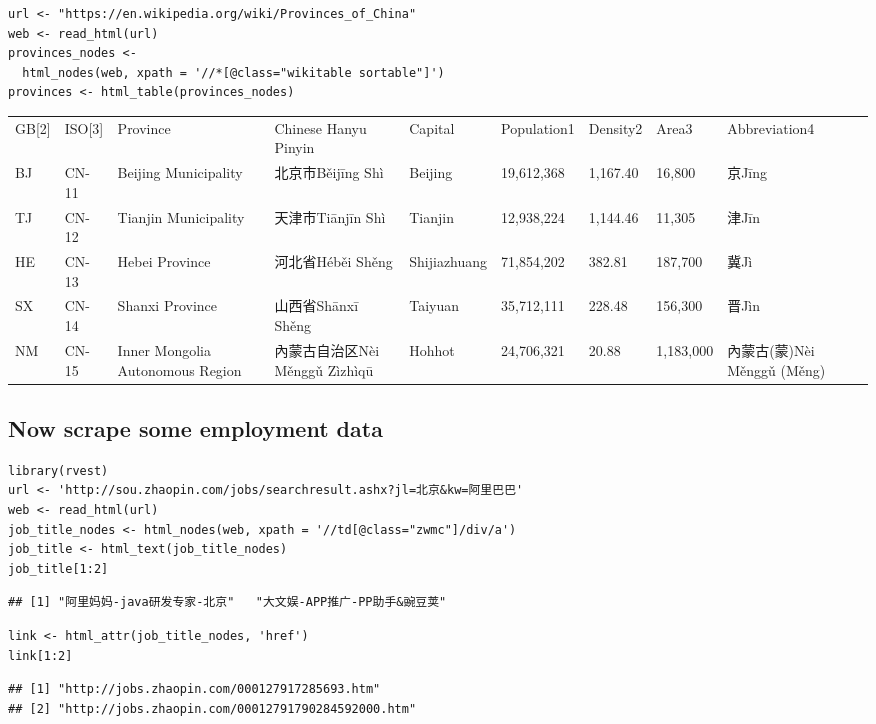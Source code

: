 \begin{verbatim}
url <- "https://en.wikipedia.org/wiki/Provinces_of_China"
web <- read_html(url)
provinces_nodes <-
  html_nodes(web, xpath = '//*[@class="wikitable sortable"]')
provinces <- html_table(provinces_nodes)
\end{verbatim}

\begin{longtable}[]{@{}lllllllll@{}}
\toprule
GB{[}2{]} & ISO{[}3{]} & Province & Chinese Hanyu Pinyin & Capital &
Population1 & Density2 & Area3 & Abbreviation4\tabularnewline
BJ & CN-11 & Beijing Municipality & 北京市Běijīng Shì & Beijing &
19,612,368 & 1,167.40 & 16,800 & 京Jīng\tabularnewline
TJ & CN-12 & Tianjin Municipality & 天津市Tiānjīn Shì & Tianjin &
12,938,224 & 1,144.46 & 11,305 & 津Jīn\tabularnewline
HE & CN-13 & Hebei Province & 河北省Héběi Shěng & Shijiazhuang &
71,854,202 & 382.81 & 187,700 & 冀Jì\tabularnewline
SX & CN-14 & Shanxi Province & 山西省Shānxī Shěng & Taiyuan & 35,712,111
& 228.48 & 156,300 & 晋Jìn\tabularnewline
NM & CN-15 & Inner Mongolia Autonomous Region & 內蒙古自治区Nèi Měnggǔ
Zìzhìqū & Hohhot & 24,706,321 & 20.88 & 1,183,000 & 內蒙古(蒙)Nèi Měnggǔ
(Měng)\tabularnewline
\bottomrule
\end{longtable}

\subsection{Now scrape some employment
data}\label{now-scrape-some-employment-data}

\begin{verbatim}
library(rvest)
url <- 'http://sou.zhaopin.com/jobs/searchresult.ashx?jl=北京&kw=阿里巴巴'
web <- read_html(url)
job_title_nodes <- html_nodes(web, xpath = '//td[@class="zwmc"]/div/a')
job_title <- html_text(job_title_nodes)
job_title[1:2]
\end{verbatim}

\begin{verbatim}
## [1] "阿里妈妈-java研发专家-北京"   "大文娱-APP推广-PP助手&豌豆荚"
\end{verbatim}

\begin{verbatim}
link <- html_attr(job_title_nodes, 'href')
link[1:2]
\end{verbatim}

\begin{verbatim}
## [1] "http://jobs.zhaopin.com/000127917285693.htm"     
## [2] "http://jobs.zhaopin.com/00012791790284592000.htm"
\end{verbatim}

